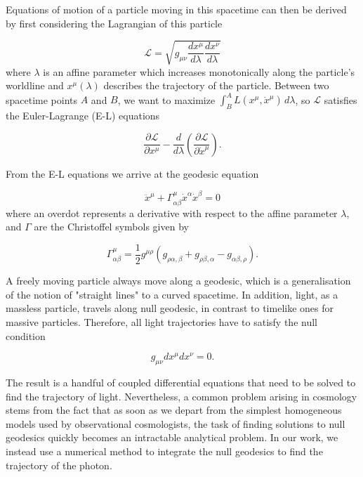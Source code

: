 Equations of motion of a particle moving in this spacetime can then be derived by first considering the Lagrangian of this particle

\begin{equation}
  \mathcal{L} = \sqrt{g_{\mu \nu} \frac{dx^{\mu}}{d \lambda} \frac{dx^{\nu}}{d \lambda}}
\end{equation}
where $\lambda$ is an affine parameter which increases monotonically along the particle's worldline and $x^{\mu}(\lambda)$ describes the trajectory of the particle. Between two spacetime points $A$ and $B$, we want to maximize $\int^{A}_{B} L(x^{\mu}, \dot{x}^{\mu})\, d \lambda$, so $\mathcal{L}$ satisfies the Euler-Lagrange (E-L) equations

\begin{equation}
  \frac{\partial \mathcal{L}}{\partial x^{\mu}} - \frac{d}{d \lambda}\left ( \frac{\partial \mathcal{L}}{\partial \dot{x}^{\mu}} \right ).
  \label{eq:euler-lagrange-eqn}
\end{equation}

From the E-L equations we arrive at the geodesic equation

\begin{equation}
  \ddot{x}^{\mu} + \Gamma^{\mu}_{\alpha \beta} \dot{x}^{\alpha} \dot{x}^{\beta} = 0 
  \label{eq:geodesic-eqn}
\end{equation}
where an overdot represents a derivative with respect to the affine parameter $\lambda$, and $\Gamma$ are the Christoffel symbols given by

\begin{equation}
  \Gamma^{\mu}_{\alpha \beta} = \frac{1}{2} g^{\mu \rho} (g_{\rho \alpha, \beta} + g_{\rho \beta, \alpha} - g_{\alpha \beta, \rho}).
  \label{eq:christoffels}
\end{equation}

A freely moving particle always move along a geodesic, which is a generalisation of the notion of "straight lines" to a curved spacetime. In addition, light, as a massless particle, travels along null geodesic, in contrast to timelike ones for massive particles. Therefore, all light trajectories have to satisfy the null condition

\begin{equation}
  g_{\mu \nu} dx^{\mu} dx^{\nu} = 0.
  \label{eq:null-condition}
\end{equation}

The result is a handful of coupled differential equations that need to be solved to find the trajectory of light. Nevertheless, a common problem arising in cosmology stems from the fact that as soon as we depart from the simplest homogeneous models used by observational cosmologists, the task of finding solutions to null geodesics quickly becomes an intractable analytical problem. In our work, we instead use a numerical method to integrate the null geodesics to find the trajectory of the photon. 

